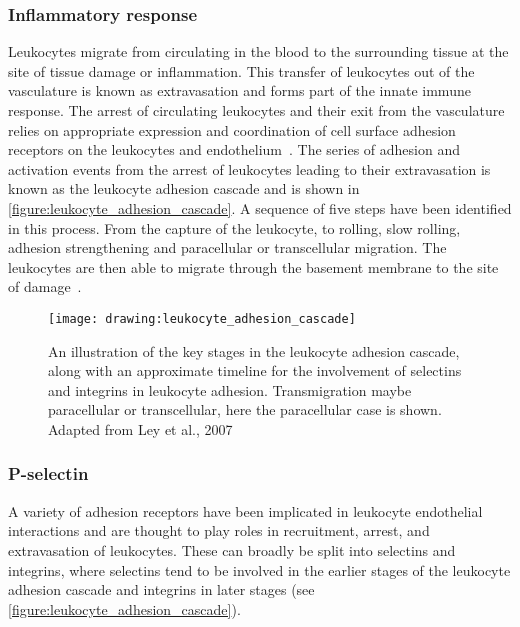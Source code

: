 \subsubsection{Inflammatory response}
Leukocytes migrate from circulating in the blood to the surrounding tissue at the site of tissue damage or inflammation. This transfer of leukocytes out of the vasculature is known as extravasation and forms part of the innate immune response. The arrest of circulating leukocytes and their exit from the vasculature relies on appropriate expression and coordination of cell surface adhesion receptors on the leukocytes and endothelium~\cite{Mayadas1993}. The series of adhesion and activation events from the arrest of leukocytes leading to their extravasation is known as the leukocyte adhesion cascade and is shown in \autoref{figure:leukocyte_adhesion_cascade}. A sequence of five steps have been identified in this process. From the capture of the leukocyte, to rolling, slow rolling, adhesion strengthening and paracellular or transcellular migration. The leukocytes are then able to migrate through the basement membrane to the site of damage~\cite{Ley2007}.

\begin{figure}[htbp!]
	\centering
	\texttt{[image: drawing:leukocyte\_adhesion\_cascade]}
	\caption[The leukocyte adhesion cascade]{An illustration of the key stages in the leukocyte adhesion cascade, along with an approximate timeline for the involvement of selectins and integrins in leukocyte adhesion. Transmigration maybe paracellular or transcellular, here the paracellular case is shown. Adapted from Ley et al., 2007~\cite{Ley2007}} 
	\label{figure:leukocyte_adhesion_cascade}
\end{figure}

\subsubsection{P-selectin}
A variety of adhesion receptors have been implicated in leukocyte endothelial interactions and are thought to play roles in recruitment, arrest, and extravasation of leukocytes. These can broadly be split into selectins and integrins, where selectins tend to be involved in the earlier stages of the leukocyte adhesion cascade and integrins in later stages (see \autoref{figure:leukocyte_adhesion_cascade}).

